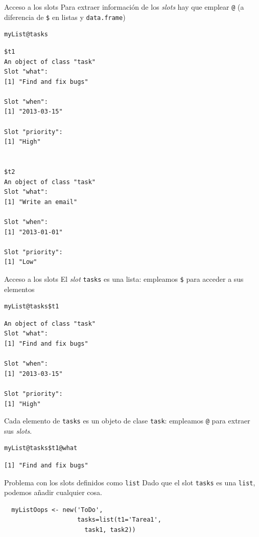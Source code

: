 \documentclass[xcolor={usenames,svgnames,dvipsnames}]{beamer}
\begin{document}
\begin{frame}[fragile,label={sec:orgc9b3570}]{Acceso a los slots}
 Para extraer información de los \emph{slots} hay que emplear \texttt{@} (a
diferencia de \texttt{\$} en listas y \texttt{data.frame})
\lstset{language=r,label= ,caption= ,captionpos=b,numbers=none}
\begin{lstlisting}
myList@tasks
\end{lstlisting}

\begin{verbatim}
$t1
An object of class "task"
Slot "what":
[1] "Find and fix bugs"

Slot "when":
[1] "2013-03-15"

Slot "priority":
[1] "High"


$t2
An object of class "task"
Slot "what":
[1] "Write an email"

Slot "when":
[1] "2013-01-01"

Slot "priority":
[1] "Low"
\end{verbatim}
\end{frame}

\begin{frame}[fragile,label={sec:org92e67d7}]{Acceso a los slots}
 El \emph{slot} \texttt{tasks} es una lista: empleamos \texttt{\$} para acceder a sus elementos
\lstset{language=r,label= ,caption= ,captionpos=b,numbers=none}
\begin{lstlisting}
myList@tasks$t1
\end{lstlisting}

\begin{verbatim}
An object of class "task"
Slot "what":
[1] "Find and fix bugs"

Slot "when":
[1] "2013-03-15"

Slot "priority":
[1] "High"
\end{verbatim}

Cada elemento de \texttt{tasks} es un objeto de clase \texttt{task}: empleamos
\texttt{@} para extraer sus \emph{slots}.
\lstset{language=r,label= ,caption= ,captionpos=b,numbers=none}
\begin{lstlisting}
myList@tasks$t1@what
\end{lstlisting}

\begin{verbatim}
[1] "Find and fix bugs"
\end{verbatim}
\end{frame}

\begin{frame}[fragile,label={sec:org342472d}]{Problema con los slots definidos como \texttt{list}}
 Dado que el slot \texttt{tasks} es una \texttt{list}, podemos añadir cualquier
cosa. 
\lstset{language=r,label= ,caption= ,captionpos=b,numbers=none}
\begin{lstlisting}
  myListOops <- new('ToDo',
                    tasks=list(t1='Tarea1',
                      task1, task2))
\end{lstlisting}
\end{frame}
\end{document}
